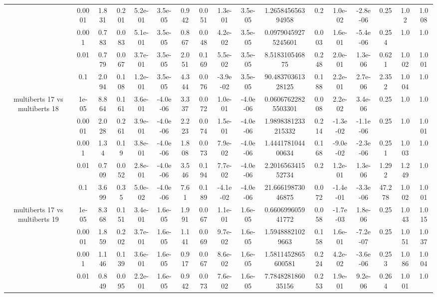 \begin{tabular}{|c|c|c|c|c|c|c|c|c|c|c|c|c|c|c|c|c|}
 & 0.0001 & 1.831 & 0.201 & 5.2e-01 & 3.5e-05 & 0.942 & 0.051 & 1.3e-01 & 3.5e-05 & 1.265845656394958 & 0.2 & 1.0e-02 & -2.8e-06 & 0.25 & 1.02 & 1.008 \\
 & 0.001 & 0.783 & 0.083 & 5.1e-01 & 3.5e-05 & 0.867 & 0.048 & 4.2e-02 & 3.5e-05 & 0.09790459275245601 & 0.003 & 1.6e-01 & -5.4e-06 & 0.254 & 1.0 & 1.0 \\
 & 0.01 & 0.779 & 0.067 & 3.7e-01 & 3.5e-05 & 2.051 & 0.169 & 5.5e-02 & 3.5e-05 & 8.518310546875 & 0.248 & 2.0e-01 & 1.3e-06 & 0.621 & 1.002 & 1.001 \\
 & 0.1 & 2.094 & 0.108 & 1.2e-01 & 3.5e-05 & 4.344 & 0.076 & -3.9e-02 & 3.5e-05 & 90.48370361328125 & 0.188 & 2.2e-01 & 2.7e-06 & 2.352 & 1.004 & 1.0 \\
\hline
\multirow{5}{*}{multiberts 17 vs multiberts 18} & 1e-05 & 8.864 & 0.161 & 3.6e-01 & -4.0e-06 & 3.337 & 0.072 & 1.0e-01 & -4.0e-06 & 0.06067622825503301 & 0.008 & 2.2e-02 & 3.4e-06 & 0.25 & 1.0 & 1.0 \\
 & 0.0001 & 2.028 & 0.261 & 3.9e-01 & -4.0e-06 & 2.223 & 0.074 & 1.5e-01 & -4.0e-06 & 1.9898381233215332 & 0.214 & -1.3e-02 & -1.1e-06 & 0.25 & 1.0 & 1.001 \\
 & 0.001 & 1.34 & 0.19 & 3.8e-01 & -4.0e-06 & 1.808 & 0.073 & 7.9e-02 & -4.0e-06 & 1.444178104400634 & 0.168 & -9.0e-02 & -2.3e-06 & 0.251 & 1.003 & 1.0 \\
 & 0.01 & 0.709 & 0.052 & 2.8e-01 & -4.0e-06 & 3.546 & 0.194 & 7.7e-02 & -4.0e-06 & 2.201656341552734 & 0.2 & 1.2e-01 & 1.3e-06 & 1.292 & 1.249 & 1.0 \\
 & 0.1 & 3.699 & 0.35 & 5.0e-02 & -4.0e-06 & 7.61 & 0.189 & -4.1e-02 & -4.0e-06 & 21.66619873046875 & 0.072 & -1.4e-01 & -3.3e-06 & 47.278 & 1.002 & 1.001 \\
\hline
\multirow{5}{*}{multiberts 17 vs multiberts 19} & 1e-05 & 8.368 & 0.151 & 3.4e-01 & 1.6e-05 & 1.991 & 0.067 & 1.1e-01 & 1.6e-05 & 0.660699605941772 & 0.058 & -1.7e-03 & 1.8e-06 & 0.25 & 1.043 & 1.015 \\
 & 0.0001 & 1.859 & 0.202 & 3.7e-01 & 1.6e-05 & 1.141 & 0.069 & 9.7e-02 & 1.6e-05 & 1.59488821029663 & 0.158 & 1.6e-01 & -7.2e-07 & 0.25 & 1.051 & 1.037 \\
 & 0.001 & 1.146 & 0.139 & 3.6e-01 & 1.6e-05 & 0.917 & 0.067 & 8.6e-02 & 1.6e-05 & 1.5811452865600581 & 0.224 & 4.2e-02 & -3.6e-06 & 0.253 & 1.086 & 1.004 \\
 & 0.01 & 0.849 & 0.095 & 2.2e-01 & 1.6e-05 & 0.942 & 0.073 & 7.6e-02 & 1.6e-05 & 7.784828186035156 & 0.253 & 1.9e-01 & 9.2e-06 & 0.264 & 1.001 & 1.0 \\

\end{tabular}
